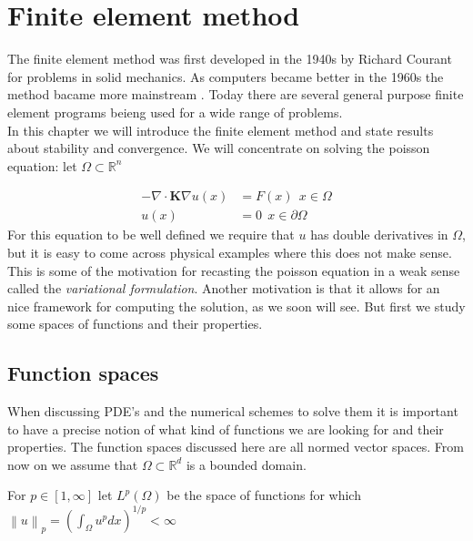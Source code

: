 \documentclass[../Main/main.tex]{subfiles}
\begin{document}
	\graphicspath{{../Finite element method/figs/}}
	\chapter{Finite element method}
	The finite element method was first developed in the 1940s by Richard Courant for problems in solid mechanics. As computers became better in the 1960s the method bacame more mainstream\cite{Stein2014} . Today there are several general purpose finite element programs beieng used for a wide range of problems.\\
	In this chapter we will introduce the finite element method and state results about stability and convergence.
	We will concentrate on solving the poisson equation: let $\Omega \subset \mathbb{R}^n$
	

	\begin{equation} \label{eq:poisson}
		\begin{split}
			-\nabla \cdot \pmb{K} \nabla u(x) &= F(x) \ \  x\in \Omega \\ 
			u(x) &= 0 \ \ x\in \partial \Omega
		\end{split}
	\end{equation}
	For this equation to be well defined we require that $u$ has double derivatives in $\Omega$, but it is easy to come across physical examples where this does not make sense.
	This is some of the motivation for recasting the poisson equation in a weak sense called the \emph{variational formulation}. Another motivation is that it allows for an nice framework for computing the solution, as we soon will see. But first we study some spaces of functions and their properties.
	
	
	\section*{Function spaces}
	When discussing PDE's and the numerical schemes to solve them it is important to have a precise notion of what kind of functions we are looking for and their properties. The function spaces discussed here are all normed vector spaces. From now on we assume that $\Omega \subset \mathbb{R}^d$ is a bounded domain.
	\begin{definition}[$L^p$ space]
		For $p\in [1,\infty]$ let $L^p(\Omega)$ be the space of functions for which  $\left \| u \right \|_p = (\int_{\Omega} u^pdx)^{1/p} <\infty$
	\end{definition}
\end{document}
